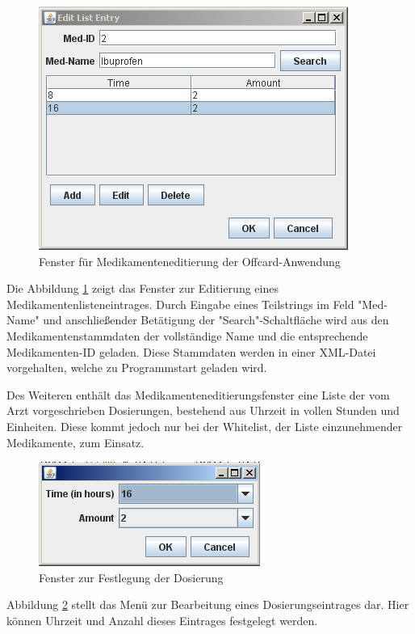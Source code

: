 \documentclass[parskip]{scrartcl}
\begin{document}
		\begin{figure}[H]
			\centering
			\includegraphics[width=.6\linewidth]{./mededitgui.png}
			\caption{Fenster für Medikamenteneditierung der Offcard-Anwendung}
			\label{fig:mededit}
		\end{figure}
		
		Die Abbildung \ref{fig:mededit} zeigt das Fenster zur Editierung eines Medikamentenlisteneintrages. Durch Eingabe eines Teilstrings im Feld "Med-Name" und anschließender Betätigung der "Search"-Schaltfläche wird aus den Medikamentenstammdaten der vollständige Name und die entsprechende Medikamenten-ID geladen. Diese Stammdaten werden in einer XML-Datei vorgehalten, welche zu Programmstart geladen wird.
		
		Des Weiteren enthält das Medikamenteneditierungsfenster eine Liste der vom Arzt vorgeschrieben Dosierungen, bestehend aus Uhrzeit in vollen Stunden und Einheiten. Diese kommt jedoch nur bei der Whitelist, der Liste einzunehmender Medikamente, zum Einsatz. 
		
		\begin{figure}[H]
			\centering
			\includegraphics[width=.4\linewidth]{./dosageeditgui.png}
			\caption{Fenster zur Festlegung der Dosierung}
			\label{fig:dosageedit}
		\end{figure}
		
		Abbildung \ref{fig:dosageedit} stellt das Menü zur Bearbeitung eines Dosierungseintrages dar. Hier können Uhrzeit und Anzahl dieses Eintrages festgelegt werden.
		
\end{document}
